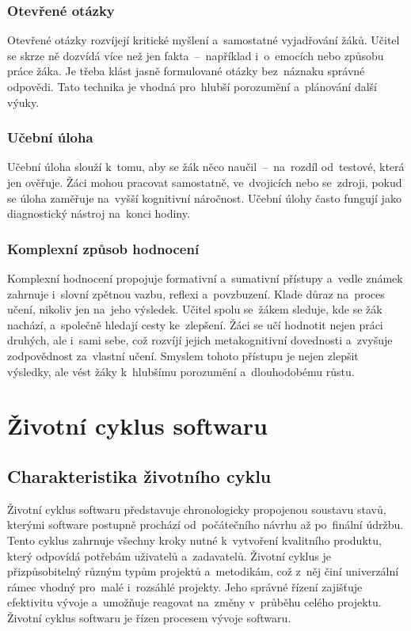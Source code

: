 \documentclass[male,czech,api_bc]{kitheses}
\begin{document}
\subsubsection{Otevřené otázky}

Otevřené otázky rozvíjejí kritické myšlení a~samostatné vyjadřování žáků. Učitel se skrze ně dozvídá více než jen fakta~--~například i~o~emocích nebo způsobu práce žáka. Je třeba klást jasně formulované otázky bez~náznaku správné odpovědi. Tato technika je vhodná pro~hlubší porozumění a~plánování další výuky.

\subsubsection{Učební úloha}

Učební úloha slouží k~tomu, aby se žák něco naučil~--~na~rozdíl od~testové, která jen ověřuje. Žáci mohou pracovat samostatně, ve~dvojicích nebo se~zdroji, pokud se úloha zaměřuje na~vyšší kognitivní náročnost. Učební úlohy často fungují jako diagnostický nástroj na~konci hodiny.

\subsubsection{Komplexní způsob hodnocení}

Komplexní hodnocení propojuje formativní a~sumativní přístupy a~vedle známek zahrnuje i~slovní zpětnou vazbu, reflexi a~povzbuzení. Klade důraz na~proces učení, nikoliv jen na~jeho výsledek. Učitel spolu se~žákem sleduje, kde se žák nachází, a~společně hledají cesty ke~zlepšení. Žáci se učí hodnotit nejen práci druhých, ale i~sami sebe, což rozvíjí jejich metakognitivní dovednosti a~zvyšuje zodpovědnost za~vlastní učení. Smyslem tohoto přístupu je nejen zlepšit výsledky, ale vést žáky k~hlubšímu porozumění a~dlouhodobému růstu.


\section{Životní cyklus softwaru}

\subsection{Charakteristika životního cyklu}

Životní cyklus softwaru představuje chronologicky propojenou soustavu stavů, kterými software postupně prochází od~počátečního návrhu až po~finální údržbu. Tento cyklus zahrnuje všechny kroky nutné k~vytvoření kvalitního produktu, který odpovídá potřebám uživatelů a~zadavatelů. Životní cyklus je přizpůsobitelný různým typům projektů a~metodikám, což z~něj činí univerzální rámec vhodný pro~malé i~rozsáhlé projekty. Jeho správné řízení zajišťuje efektivitu vývoje a~umožňuje reagovat na~změny v~průběhu celého projektu. Životní cyklus softwaru je řízen procesem vývoje softwaru.
\end{document}
